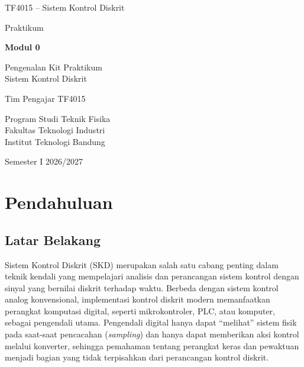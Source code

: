 \documentclass[11pt,a4paper]{article}
\begin{document}
\begin{titlepage}
	\centering
	\vspace*{2cm}
	{\large TF4015 -- Sistem Kontrol Diskrit\par}
	\vspace{2.5cm}
	{\Large Praktikum\par}
	\vspace{0.4cm}
	{\huge\bfseries Modul 0\par}
	\vspace{0.4cm}
	{\LARGE Pengenalan Kit Praktikum\\Sistem Kontrol Diskrit\par}
	\vfill
	{\large Tim Pengajar TF4015\par}
	\vspace{0.3cm}
	{\large Program Studi Teknik Fisika\\Fakultas Teknologi Industri\\Institut Teknologi Bandung\par}
	\vspace{0.8cm}
	{\large Semester I 2026/2027\par}
\end{titlepage}

\tableofcontents
\newpage
{}
\setcounter{page}{1}

\section{Pendahuluan}
\subsection{Latar Belakang}
Sistem Kontrol Diskrit (SKD) merupakan salah satu cabang penting dalam teknik kendali yang mempelajari analisis dan perancangan sistem kontrol dengan sinyal yang bernilai diskrit terhadap waktu. Berbeda dengan sistem kontrol analog konvensional, implementasi kontrol diskrit modern memanfaatkan perangkat komputasi digital, seperti mikrokontroler, PLC, atau komputer, sebagai pengendali utama. Pengendali digital hanya dapat ``melihat'' sistem fisik pada saat-saat pencacahan (\textit{sampling}) dan hanya dapat memberikan aksi kontrol melalui konverter, sehingga pemahaman tentang perangkat keras dan pewaktuan menjadi bagian yang tidak terpisahkan dari perancangan kontrol diskrit.
\end{document}
